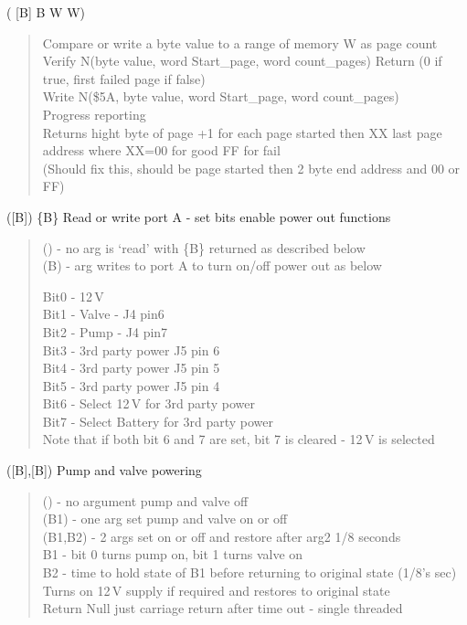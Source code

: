 { ( {[}B{]} B W W) }
\begin{quote}
	Compare or write a byte value to a range of memory W as page count\\
	Verify N(byte value, word Start\_page, word count\_pages) Return (0 if
	true, first failed page if false)\\
	Write N(\$5A, byte value, word Start\_page, word count\_pages)\\
	Progress reporting\\
	Returns hight byte of page +1 for each page started then XX last page
	address where XX=00 for good FF for fail\\
	(Should fix this, should be page started then 2 byte end address and 00
	or FF)\\
\end{quote}

{ ({[}B{]}) \{B\} Read or write port A - set bits enable power
out function}s
\begin{quote}
	() - no arg is `read' with \{B\} returned as described below\\
	(B) - arg writes to port A to turn on/off power out as below
	
	Bit0 - 12\,V\\
	Bit1 - Valve - J4 pin6\\
	Bit2 - Pump - J4 pin7\\
	Bit3 - 3rd party power J5 pin 6\\
	Bit4 - 3rd party power J5 pin 5\\
	Bit5 - 3rd party power J5 pin 4\\
	Bit6 - Select 12\,V for 3rd party power\\
	Bit7 - Select Battery for 3rd party power\\
	Note that if both bit 6 and 7 are set, bit 7 is cleared - 12\,V is
	selected\\
\end{quote}

{ ({[}B{]},{[}B{]}) Pump and valve powering}
\begin{quote}
	() - no argument pump and valve off\\
	(B1) - one arg set pump and valve on or off\\
	(B1,B2) - 2 args set on or off and restore after arg2 1/8 seconds\\
	B1 - bit 0 turns pump on, bit 1 turns valve on\\
	B2 - time to hold state of B1 before returning to original state (1/8's
	sec)\\
	Turns on 12\,V supply if required and restores to original state\\
	Return Null just carriage return after time out - single threaded\\
\end{quote}

